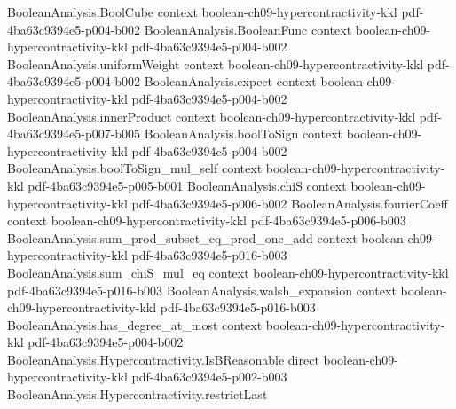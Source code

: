 \begin{lemma}
\leanok
{}
\label{BooleanAnalysis.Hypercontractivity.bonami_lemma}
\proofstep
  {BooleanAnalysis.BoolCube}
  {context}
  {boolean-ch09-hypercontractivity-kkl}
  {pdf-4ba63c9394e5-p004-b002}
\proofstep
  {BooleanAnalysis.BooleanFunc}
  {context}
  {boolean-ch09-hypercontractivity-kkl}
  {pdf-4ba63c9394e5-p004-b002}
\proofstep
  {BooleanAnalysis.uniformWeight}
  {context}
  {boolean-ch09-hypercontractivity-kkl}
  {pdf-4ba63c9394e5-p004-b002}
\proofstep
  {BooleanAnalysis.expect}
  {context}
  {boolean-ch09-hypercontractivity-kkl}
  {pdf-4ba63c9394e5-p004-b002}
\proofstep
  {BooleanAnalysis.innerProduct}
  {context}
  {boolean-ch09-hypercontractivity-kkl}
  {pdf-4ba63c9394e5-p007-b005}
\proofstep
  {BooleanAnalysis.boolToSign}
  {context}
  {boolean-ch09-hypercontractivity-kkl}
  {pdf-4ba63c9394e5-p004-b002}
\proofstep
  {BooleanAnalysis.boolToSign_mul_self}
  {context}
  {boolean-ch09-hypercontractivity-kkl}
  {pdf-4ba63c9394e5-p005-b001}
\proofstep
  {BooleanAnalysis.chiS}
  {context}
  {boolean-ch09-hypercontractivity-kkl}
  {pdf-4ba63c9394e5-p006-b002}
\proofstep
  {BooleanAnalysis.fourierCoeff}
  {context}
  {boolean-ch09-hypercontractivity-kkl}
  {pdf-4ba63c9394e5-p006-b003}
\proofstep
  {BooleanAnalysis.sum_prod_subset_eq_prod_one_add}
  {context}
  {boolean-ch09-hypercontractivity-kkl}
  {pdf-4ba63c9394e5-p016-b003}
\proofstep
  {BooleanAnalysis.sum_chiS_mul_eq}
  {context}
  {boolean-ch09-hypercontractivity-kkl}
  {pdf-4ba63c9394e5-p016-b003}
\proofstep
  {BooleanAnalysis.walsh_expansion}
  {context}
  {boolean-ch09-hypercontractivity-kkl}
  {pdf-4ba63c9394e5-p016-b003}
\proofstep
  {BooleanAnalysis.has_degree_at_most}
  {context}
  {boolean-ch09-hypercontractivity-kkl}
  {pdf-4ba63c9394e5-p004-b002}
\proofstep
  {BooleanAnalysis.Hypercontractivity.IsBReasonable}
  {direct}
  {boolean-ch09-hypercontractivity-kkl}
  {pdf-4ba63c9394e5-p002-b003}
\proofstep
  {BooleanAnalysis.Hypercontractivity.restrictLast}

\end{lemma}
